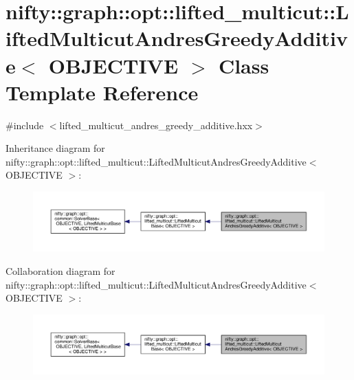 \hypertarget{classnifty_1_1graph_1_1opt_1_1lifted__multicut_1_1LiftedMulticutAndresGreedyAdditive}{}\section{nifty\+:\+:graph\+:\+:opt\+:\+:lifted\+\_\+multicut\+:\+:Lifted\+Multicut\+Andres\+Greedy\+Additive$<$ O\+B\+J\+E\+C\+T\+I\+VE $>$ Class Template Reference}
\label{classnifty_1_1graph_1_1opt_1_1lifted__multicut_1_1LiftedMulticutAndresGreedyAdditive}


{\ttfamily \#include $<$lifted\+\_\+multicut\+\_\+andres\+\_\+greedy\+\_\+additive.\+hxx$>$}



Inheritance diagram for nifty\+:\+:graph\+:\+:opt\+:\+:lifted\+\_\+multicut\+:\+:Lifted\+Multicut\+Andres\+Greedy\+Additive$<$ O\+B\+J\+E\+C\+T\+I\+VE $>$\+:
\nopagebreak
\begin{figure}[H]
\begin{center}
\leavevmode
\includegraphics[width=350pt]{classnifty_1_1graph_1_1opt_1_1lifted__multicut_1_1LiftedMulticutAndresGreedyAdditive__inherit__graph}
\end{center}
\end{figure}


Collaboration diagram for nifty\+:\+:graph\+:\+:opt\+:\+:lifted\+\_\+multicut\+:\+:Lifted\+Multicut\+Andres\+Greedy\+Additive$<$ O\+B\+J\+E\+C\+T\+I\+VE $>$\+:
\nopagebreak
\begin{figure}[H]
\begin{center}
\leavevmode
\includegraphics[width=350pt]{classnifty_1_1graph_1_1opt_1_1lifted__multicut_1_1LiftedMulticutAndresGreedyAdditive__coll__graph}
\end{center}
\end{figure}
